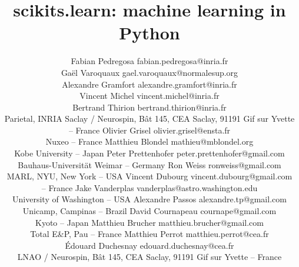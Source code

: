 \documentclass[twoside,11pt]{article}
\begin{document}
\title{scikits.learn: machine learning in Python}


\author{\name Fabian Pedregosa \email fabian.pedregosa@inria.fr \\
        \name Ga\"el Varoquaux \email gael.varoquaux@normalesup.org  \\
        \name Alexandre Gramfort \email alexandre.gramfort@inria.fr \\
        \name Vincent Michel  \email vincent.michel@inria.fr \\
        \name Bertrand Thirion  \email bertrand.thirion@inria.fr \\
        \addr Parietal, INRIA Saclay / Neurospin, 
	    B\^at 145, CEA Saclay, 91191 Gif sur Yvette -- {\sc France}
        \AND
        \name Olivier Grisel \email olivier.grisel@ensta.fr \\
        \addr Nuxeo -- {\sc France} 
        \AND
        \name Matthieu Blondel \email mathieu@mblondel.org \\
        \addr Kobe University -- {\sc Japan} 
        \AND
        \name Peter Prettenhofer \email peter.prettenhofer@gmail.com \\
        \addr Bauhaus-Universit\"at Weimar -- {\sc Germany}
        \AND
        \name Ron Weiss \email ronweiss@gmail.com \\
        \addr MARL, NYU, New York -- {\sc USA}
        \AND
        \name Vincent Dubourg \email vincent.dubourg@gmail.com\\
        \addr  -- {\sc France}
        \AND
        \name Jake Vanderplas \email vanderplas@astro.washington.edu\\
        \addr University of Washington -- {\sc USA}
	\AND
        \name Alexandre Passos \email alexandre.tp@gmail.com \\
        \addr Unicamp,  Campinas -- {\sc Brazil}
        \AND
        \name David Cournapeau \email cournape@gmail.com \\
        \addr Kyoto -- {\sc Japan}
        \AND
        \name Matthieu Brucher \email matthieu.brucher@gmail.com \\
        \addr Total E\&P,  Pau -- {\sc France}
        \AND
        \name Matthieu Perrot \email matthieu.perrot@cea.fr\\
        \name \'Edouard Duchesnay \email edouard.duchesnay@cea.fr \\
        \addr LNAO / Neurospin, 
	    B\^at 145, CEA Saclay, 91191 Gif sur Yvette -- {\sc France}
}


\end{document}

